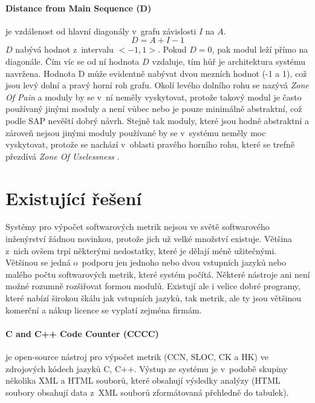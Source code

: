 \documentclass[11pt,twoside,a4paper]{book}
\begin{document}
\paragraph{Distance from Main Sequence (D)} je vzdálenost od hlavní diagonály v~grafu závislosti $I$ na $A$.
$$D = A + I - 1$$
$D$ nabývá hodnot z~intervalu $<-1,1>$. Pokud $D = 0$, pak modul leží přímo na diagonále. Čím víc se od ní hodnota $D$ vzdaluje,
tím hůř je architektura systému navržena. Hodnota D může evidentně nabývat dvou mezních hodnot (-1 a 1), což jsou levý dolní
a pravý horní roh grafu. Okolí levého dolního rohu se nazývá \textit{Zone Of Pain} \cite{STAN_paper} a moduly by se v~ní neměly vyskytovat,
protože takový modul je často používaný jinými moduly a není vůbec nebo je pouze minimálně abstraktní, což podle SAP nevěští dobrý návrh.
Stejně tak moduly, které jsou hodně abstraktní a zároveň nejsou jinými moduly používané by se v~systému neměly moc vyskytovat,
protože se nachází v~oblasti pravého horního rohu, které se trefně přezdívá \textit{Zone Of Uselessness} \cite{STAN_paper}.

\section{Existující řešení}
\label{sec:ExistujiciSW}
Systémy pro výpočet softwarových metrik nejsou ve světě softwarového inženýrství žádnou novinkou, protože jich už velké množství existuje.
Většina z~nich ovšem trpí některými nedostatky, které je dělají méně užitečnými. Většinou se jedná o~podporu
jen jednoho nebo dvou vstupních jazyků nebo malého počtu softwarových metrik, které systém počítá.
Některé nástroje ani není možné rozumně rozšiřovat formou modulů. Existují ale i velice dobré programy,
které nabízí širokou škálu jak vstupních jazyků, tak metrik, ale ty jsou většinou komerční a nákup licence
se vyplatí zejména firmám.

\paragraph{C and C++ Code Counter (CCCC)}\cite{cccc} je open-source nástroj pro výpočet metrik (CCN, SLOC, CK a HK) ve zdrojových kódech jazyků C, C++.
Výstup ze systému je v~podobě skupiny několika XML a HTML souborů, které obsahují výsledky analýzy (HTML soubory obsahují data z~XML souborů
zformátovaná přehledně do tabulek).
\end{document}
